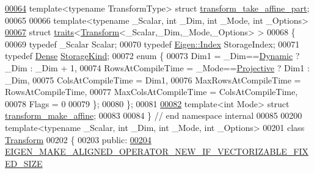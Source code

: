 \begin{DoxyCode}
\hyperlink{struct_eigen_1_1internal_1_1transform__take__affine__part}{00064} \textcolor{keyword}{template}<\textcolor{keyword}{typename} TransformType> \textcolor{keyword}{struct }\hyperlink{struct_eigen_1_1internal_1_1transform__take__affine__part}{transform\_take\_affine\_part};
00065 
00066 \textcolor{keyword}{template}<\textcolor{keyword}{typename} \_Scalar, \textcolor{keywordtype}{int} \_Dim, \textcolor{keywordtype}{int} \_Mode, \textcolor{keywordtype}{int} \_Options>
\hyperlink{struct_eigen_1_1internal_1_1traits_3_01_transform_3_01___scalar_00_01___dim_00_01___mode_00_01___options_01_4_01_4}{00067} \textcolor{keyword}{struct }\hyperlink{struct_eigen_1_1internal_1_1traits}{traits}<\hyperlink{group___geometry___module_class_eigen_1_1_transform}{Transform}<\_Scalar,\_Dim,\_Mode,\_Options> >
00068 \{
00069   \textcolor{keyword}{typedef} \_Scalar Scalar;
00070   \textcolor{keyword}{typedef} \hyperlink{namespace_eigen_a62e77e0933482dafde8fe197d9a2cfde}{Eigen::Index} StorageIndex;
00071   \textcolor{keyword}{typedef} \hyperlink{struct_eigen_1_1_dense}{Dense} \hyperlink{struct_eigen_1_1_dense}{StorageKind};
00072   \textcolor{keyword}{enum} \{
00073     Dim1 = \_Dim==\hyperlink{namespace_eigen_ad81fa7195215a0ce30017dfac309f0b2}{Dynamic} ? \_Dim : \_Dim + 1,
00074     RowsAtCompileTime = \_Mode==\hyperlink{group__enums_ggaee59a86102f150923b0cac6d4ff05107aead6a2de12a17aaa4f5c523215dfccad}{Projective} ? Dim1 : \_Dim,
00075     ColsAtCompileTime = Dim1,
00076     MaxRowsAtCompileTime = RowsAtCompileTime,
00077     MaxColsAtCompileTime = ColsAtCompileTime,
00078     Flags = 0
00079   \};
00080 \};
00081 
\hyperlink{struct_eigen_1_1internal_1_1transform__make__affine}{00082} \textcolor{keyword}{template}<\textcolor{keywordtype}{int} Mode> \textcolor{keyword}{struct }\hyperlink{struct_eigen_1_1internal_1_1transform__make__affine}{transform\_make\_affine};
00083 
00084 \} \textcolor{comment}{// end namespace internal}
00085 
00200 \textcolor{keyword}{template}<\textcolor{keyword}{typename} \_Scalar, \textcolor{keywordtype}{int} \_Dim, \textcolor{keywordtype}{int} \_Mode, \textcolor{keywordtype}{int} \_Options>
00201 \textcolor{keyword}{class }\hyperlink{group___geometry___module_class_eigen_1_1_transform}{Transform}
00202 \{
00203 \textcolor{keyword}{public}:
\hyperlink{group___geometry___module_a30c94c2156e9345f4bdb6cc9661e275b}{00204}   \hyperlink{group___geometry___module_a30c94c2156e9345f4bdb6cc9661e275b}{EIGEN\_MAKE\_ALIGNED\_OPERATOR\_NEW\_IF\_VECTORIZABLE\_FIXED\_SIZE}

\end{DoxyCode}
